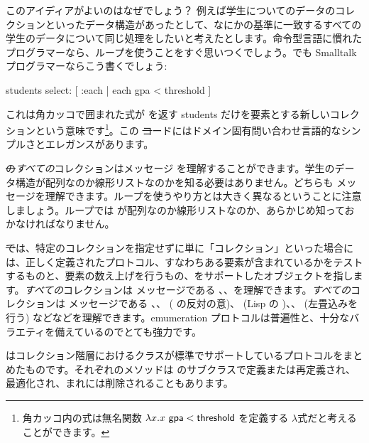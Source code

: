 \documentclass[a4paper,10pt,twoside]{book}
\begin{document}
このアイディアがよいのはなぜでしょう？
例えば学生についてのデータのコレクションといったデータ構造があったとして、なにかの基準に一致するすべての学生のデータについて同じ処理をしたいと考えたとします。命令型言語に慣れたプログラマーなら、ループを使うことをすぐ思いつくでしょう。でも Smalltalk プログラマーならこう書くでしょう:
\begin{code}{}
students select: [ :each | each gpa < threshold ]
\end{code}
\noindent
これは角カッコで囲まれた式が  を返す students だけを要素とする新しいコレクションという意味です\footnote{角カッコ内の式は無名関数 $\lambda x. x~{\sf gpa} < {\sf threshold}$ を定義する $\lambda$式だと考えることができます。}。この \st コードにはドメイン固有問い合わせ言語的なシンプルさとエレガンスがあります。

\st の\emph{すべての}コレクションはメッセージ  を理解することができます。学生のデータ構造が配列なのか線形リストなのかを知る必要はありません。どちらも  メッセージを理解できます。ループを使うやり方とは大きく異なるということに注意しましょう。ループでは  が配列なのか線形リストなのか、あらかじめ知っておかなければなりません。

\st では、特定のコレクションを指定せずに単に「コレクション」といった場合には、正しく定義されたプロトコル、すなわちある要素が含まれているかをテストするものと、要素の数え上げを行うもの、をサポートしたオブジェクトを指します。\emph{すべての}コレクションは  メッセージである \mbox{、}\mbox{、}を理解できます。\emph{すべての}コレクションは  メッセージである 、、 ( の反対の意)、 (Lisp の )、、 (左畳込みを行う) などなどを理解できます。emumeration プロトコルは普遍性と、十分なバラエティを備えているのでとても強力です。

 はコレクション階層におけるクラスが標準でサポートしているプロトコルをまとめたものです。それぞれのメソッドは  のサブクラスで定義または再定義され、最適化され、まれには削除されることもあります。
\end{document}
